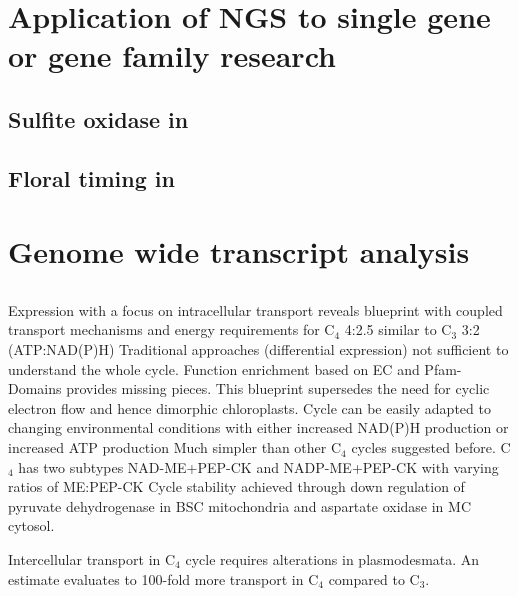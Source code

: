 	
		
	
 \section{Application of NGS to single gene or gene family research}
 \subsection{Sulfite oxidase in }
 \subsection{Floral timing in }
 
 \section{Genome wide transcript analysis}
 \subsection{}
 Expression with a focus on intracellular transport reveals blueprint with coupled transport mechanisms and energy requirements for C$_4$ 4:2.5 similar to C$_3$ 3:2 (ATP:NAD(P)H)
 Traditional approaches (differential expression) not sufficient to understand the whole cycle.
 Function enrichment based on EC and Pfam-Domains provides missing pieces.
 This blueprint supersedes the need for cyclic electron flow and hence dimorphic chloroplasts.
 Cycle can be easily adapted to changing environmental conditions with either increased NAD(P)H production or increased ATP production
 Much simpler than other C$_4$ cycles suggested before.
 C$_4$ has two subtypes NAD-ME+PEP-CK and NADP-ME+PEP-CK with varying ratios of ME:PEP-CK
 Cycle stability achieved through down regulation of pyruvate dehydrogenase in BSC mitochondria and aspartate oxidase in MC cytosol.
 
 Intercellular transport in C$_4$ cycle requires alterations in plasmodesmata.
 An estimate evaluates to 100-fold more transport in C$_4$ compared to C$_3$.

